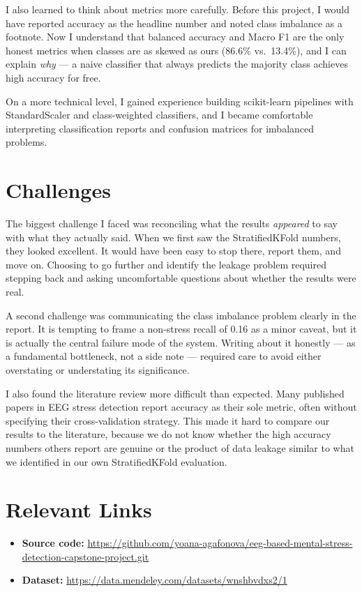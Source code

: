 \documentclass[12pt,a4paper]{article}
\begin{document}
I also learned to think about metrics more carefully. Before this project, I would have reported accuracy as the headline number and noted class imbalance as a footnote. Now I understand that balanced accuracy and Macro F1 are the only honest metrics when classes are as skewed as ours (86.6\% vs.\ 13.4\%), and I can explain \emph{why} --- a naive classifier that always predicts the majority class achieves high accuracy for free.

On a more technical level, I gained experience building scikit-learn pipelines with StandardScaler and class-weighted classifiers, and I became comfortable interpreting classification reports and confusion matrices for imbalanced problems.

\section*{Challenges}

The biggest challenge I faced was reconciling what the results \emph{appeared} to say with what they actually said. When we first saw the StratifiedKFold numbers, they looked excellent. It would have been easy to stop there, report them, and move on. Choosing to go further and identify the leakage problem required stepping back and asking uncomfortable questions about whether the results were real.

A second challenge was communicating the class imbalance problem clearly in the report. It is tempting to frame a non-stress recall of 0.16 as a minor caveat, but it is actually the central failure mode of the system. Writing about it honestly --- as a fundamental bottleneck, not a side note --- required care to avoid either overstating or understating its significance.

I also found the literature review more difficult than expected. Many published papers in EEG stress detection report accuracy as their sole metric, often without specifying their cross-validation strategy. This made it hard to compare our results to the literature, because we do not know whether the high accuracy numbers others report are genuine or the product of data leakage similar to what we identified in our own StratifiedKFold evaluation.

\section*{Relevant Links}

\begin{itemize}
	\item \textbf{Source code:} \url{https://github.com/yoana-agafonova/eeg-based-mental-stress-detection-capstone-project.git}
	\item \textbf{Dataset:} \url{https://data.mendeley.com/datasets/wnshbvdxs2/1}
\end{itemize}
\end{document}
